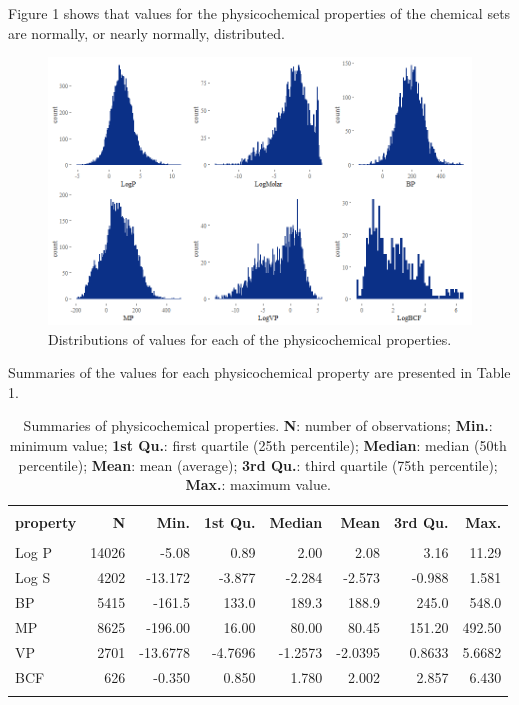 \documentclass[10pt, letter]{article}
\renewcommand{\=}{\, =\, }
\newcommand{\+}{\, +\, }
\renewcommand{\-}{\, -\, }
\begin{document}
Figure 1 shows that values for the physicochemical properties of the chemical
sets are normally, or nearly normally, distributed.

\begin{figure}[H]
  \caption{Distributions of values for each of the physicochemical properties.}
  \centering
    \includegraphics[scale=0.65]{properties.png}
\end{figure}

Summaries of the values for each physicochemical property are presented in Table 1.

\begin{table}[H]
\begin{center}
\begin{tabular}{lrrrrrrr}
\toprule
&&\\
{\bf property} & {\bf N} & {\bf Min.} & {\bf 1st Qu.} &  {\bf Median}  & {\bf Mean}  & {\bf 3rd Qu.} & {\bf Max.}\\
\midrule
&&\\
Log P  &  14026 & -5.08 & 0.89 & 2.00 & 2.08 & 3.16 & 11.29\\
Log S  &  4202 & -13.172 & -3.877 & -2.284 & -2.573 & -0.988 & 1.581\\
BP  &   5415 &-161.5 & 133.0 & 189.3 & 188.9 & 245.0 & 548.0\\
MP  &   8625& -196.00 & 16.00 & 80.00 & 80.45 & 151.20 & 492.50\\
VP  &   2701 & -13.6778 & -4.7696 & -1.2573 & -2.0395 & 0.8633 & 5.6682\\
BCF  &  626 &  -0.350 & 0.850 & 1.780 & 2.002 & 2.857 & 6.430\\
&&\\
\bottomrule
\end{tabular}
\end{center}
\caption{Summaries of physicochemical properties. \textbf{N}: number of observations; \textbf{Min.}: minimum value; \textbf{1st Qu.}: first quartile (25th percentile);
\textbf{Median}: median (50th percentile); \textbf{Mean}: mean (average); \textbf{3rd Qu.}: third quartile (75th percentile);
\textbf{Max.}: maximum value.}
\end{table}
\end{document}
